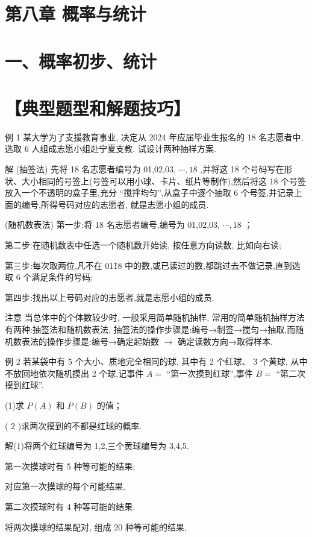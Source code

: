 \section*{第八章 概率与统计}

\section*{一、概率初步、统计}

\section*{【典型题型和解题技巧】}

例 1 某大学为了支援教育事业, 决定从 2024 年应届毕业生报名的 18 名志愿者中, 选取 6 人组成志愿小组赴宁夏支教. 试设计两种抽样方案.

解 (抽签法) 先将 18 名志愿者编号为 01,02,03, $\cdots ,{18}$ ,并将这 18 个号码写在形状、大小相同的号签上(号签可以用小球、卡片、纸片等制作),然后将这 18 个号签放入一个不透明的盒子里,充分 “搅拌均匀”,从盒子中逐个抽取 6 个号签,并记录上面的编号,所得号码对应的志愿者, 就是志愿小组的成员.

(随机数表法) 第一步:将 18 名志愿者编号,编号为 01,02,03, $\cdots ,{18}$ ；

第二步:在随机数表中任选一个随机数开始读, 按任意方向读数, 比如向右读;

第三步:每次取两位,凡不在 01\~18 中的数,或已读过的数,都跳过去不做记录,直到选取 6 个满足条件的号码;

第四步:找出以上号码对应的志愿者,就是志愿小组的成员.

注意 当总体中的个体数较少时, 一般采用简单随机抽样, 常用的简单随机抽样方法有两种:抽签法和随机数表法. 抽签法的操作步骤是:编号→制签→搅匀→抽取,而随机数表法的操作步骤是:编号→确定起始数 $\rightarrow$ 确定读数方向→取得样本.

例 2 若某袋中有 5 个大小、质地完全相同的球, 其中有 2 个红球、 3 个黄球, 从中不放回地依次随机摸出 2 个球,记事件 $A =$ “第一次摸到红球”,事件 $B =$ “第二次摸到红球”.

(1)求 $P\left( A\right)$ 和 $P\left( B\right)$ 的值；

( 2 )求两次摸到的不都是红球的概率.

解(1)将两个红球编号为 1,2,三个黄球编号为 3,4,5.

第一次摸球时有 5 种等可能的结果;

对应第一次摸球的每个可能结果,

第二次摸球时有 4 种等可能的结果.

将两次摸球的结果配对, 组成 20 种等可能的结果,

